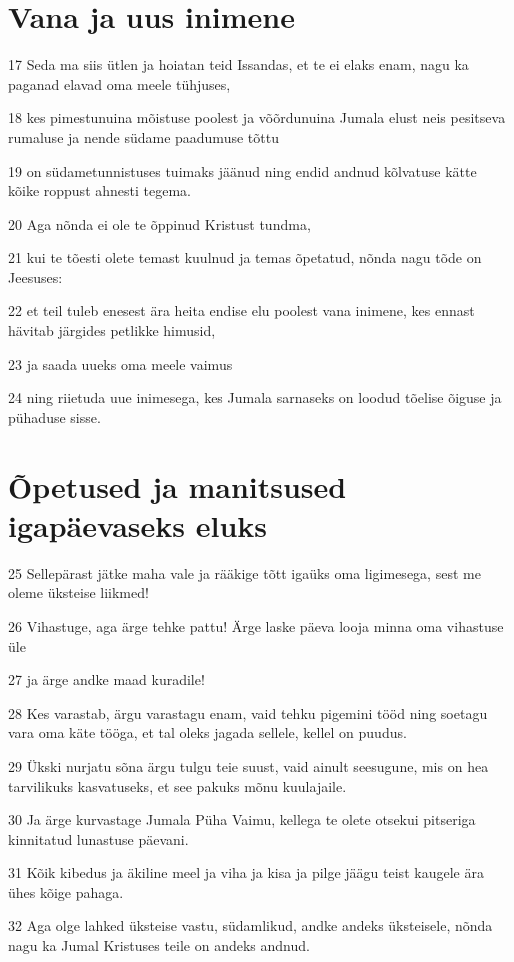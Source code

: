 \section*{Vana ja uus inimene}

\par 17 Seda ma siis ütlen ja hoiatan teid Issandas, et te ei elaks enam, nagu ka paganad elavad oma meele tühjuses,
\par 18 kes pimestunuina mõistuse poolest ja võõrdunuina Jumala elust neis pesitseva rumaluse ja nende südame paadumuse tõttu
\par 19 on südametunnistuses tuimaks jäänud ning endid andnud kõlvatuse kätte kõike roppust ahnesti tegema.
\par 20 Aga nõnda ei ole te õppinud Kristust tundma,
\par 21 kui te tõesti olete temast kuulnud ja temas õpetatud, nõnda nagu tõde on Jeesuses:
\par 22 et teil tuleb enesest ära heita endise elu poolest vana inimene, kes ennast hävitab järgides petlikke himusid,
\par 23 ja saada uueks oma meele vaimus
\par 24 ning riietuda uue inimesega, kes Jumala sarnaseks on loodud tõelise õiguse ja pühaduse sisse.

\section*{Õpetused ja manitsused igapäevaseks eluks}

\par 25 Sellepärast jätke maha vale ja rääkige tõtt igaüks oma ligimesega, sest me oleme üksteise liikmed!
\par 26 Vihastuge, aga ärge tehke pattu! Ärge laske päeva looja minna oma vihastuse üle
\par 27 ja ärge andke maad kuradile!
\par 28 Kes varastab, ärgu varastagu enam, vaid tehku pigemini tööd ning soetagu vara oma käte tööga, et tal oleks jagada sellele, kellel on puudus.
\par 29 Ükski nurjatu sõna ärgu tulgu teie suust, vaid ainult seesugune, mis on hea tarvilikuks kasvatuseks, et see pakuks mõnu kuulajaile.
\par 30 Ja ärge kurvastage Jumala Püha Vaimu, kellega te olete otsekui pitseriga kinnitatud lunastuse päevani.
\par 31 Kõik kibedus ja äkiline meel ja viha ja kisa ja pilge jäägu teist kaugele ära ühes kõige pahaga.
\par 32 Aga olge lahked üksteise vastu, südamlikud, andke andeks üksteisele, nõnda nagu ka Jumal Kristuses teile on andeks andnud.


